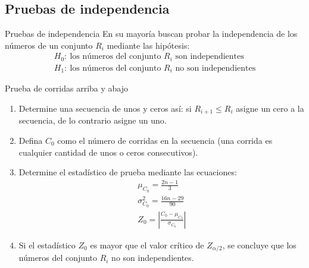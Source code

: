 \subsection{Pruebas de independencia}

\begin{frame}{Pruebas de independencia}
    En su mayoría buscan probar la independencia de los números de un conjunto $R_i$ mediante las hipótesis:
        \begin{eqnarray*}
            H_0:~\text{los números del conjunto $R_i$ son independientes}\\
            H_1:~\text{los números del conjunto $R_i$ no son independientes}
        \end{eqnarray*}
\end{frame}

\begin{frame}{Prueba de corridas arriba y abajo}
    \begin{enumerate}
        \item Determine una secuencia de unos y ceros así: si $R_{i+1}\leq R_i$ asigne un cero a la secuencia, de lo contrario asigne un uno.
        \item Defina $C_0$ como el número de corridas en la secuencia (una corrida es cualquier cantidad de unos o ceros consecutivos).
        \item Determine el estadístico de prueba mediante las ecuaciones:
            \begin{eqnarray*}
                \mu_{C_0}=\frac{2n-1}{3} \\
                \sigma^2_{C_0}=\frac{16n-29}{90}\\
                Z_0=\left|\frac{C_0-\mu_{C_0}}{\sigma_{C_0}}\right|
            \end{eqnarray*}
        \item Si el estadístico $Z_0$ es mayor que el valor crítico de $Z_{\alpha/2}$, se concluye que los números del conjunto $R_i$ no son independientes.
    \end{enumerate}
\end{frame}

